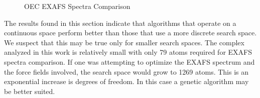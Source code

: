 \begin{figure*}
	\centering
	\caption{OEC EXAFS Spectra Comparison}
	\label{fig:pso-best}
\end{figure*}

The results found in this section indicate that algorithms that operate on a continuous space perform better than those that use a more discrete search space. We suspect that this may be true only for smaller search spaces. The complex analyzed in this work is relatively small with only 79 atoms required for EXAFS spectra comparison. If one was attempting to optimize the EXAFS spectrum and the force fields involved, the search space would grow to 1269 atoms. This is an exponential increase is degrees of freedom. In this case a genetic algorithm may be better suited.
